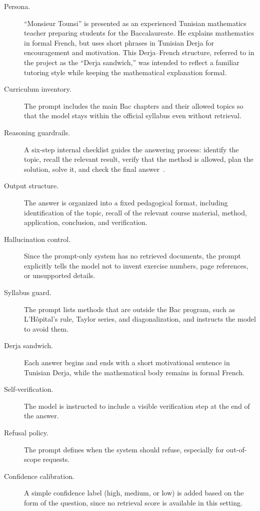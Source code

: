 \begin{description}
    \item[Persona.] ``Monsieur Tounsi'' is presented as an experienced
    Tunisian mathematics teacher preparing students for the Baccalaureate.
    He explains mathematics in formal French, but uses short phrases in
    Tunisian Derja for encouragement and motivation. This Derja--French
    structure, referred to in the project as the ``Derja sandwich,'' was
    intended to reflect a familiar tutoring style while keeping the
    mathematical explanation formal.

    \item[Curriculum inventory.] The prompt includes the main Bac chapters
    and their allowed topics so that the model stays within the official
    syllabus even without retrieval.

    \item[Reasoning guardrails.] A six-step internal checklist guides the
    answering process: identify the topic, recall the relevant result,
    verify that the method is allowed, plan the solution, solve it, and
    check the final answer~\cite{wei2022chain_of_thought}.

    \item[Output structure.] The answer is organized into a fixed pedagogical
    format, including identification of the topic, recall of the relevant
    course material, method, application, conclusion, and verification.

    \item[Hallucination control.] Since the prompt-only system has no
    retrieved documents, the prompt explicitly tells the model not to invent
    exercise numbers, page references, or unsupported details.

    \item[Syllabus guard.] The prompt lists methods that are outside the Bac
    program, such as L'H\^opital's rule, Taylor series, and diagonalization,
    and instructs the model to avoid them.

    \item[Derja sandwich.] Each answer begins and ends with a short
    motivational sentence in Tunisian Derja, while the mathematical body
    remains in formal French.

    \item[Self-verification.] The model is instructed to include a visible
    verification step at the end of the answer.

    \item[Refusal policy.] The prompt defines when the system should refuse,
    especially for out-of-scope requests.

    \item[Confidence calibration.] A simple confidence label (high, medium,
    or low) is added based on the form of the question, since no retrieval
    score is available in this setting.
\end{description}

